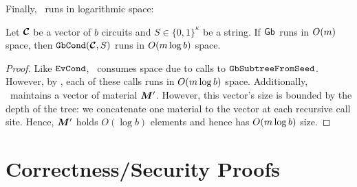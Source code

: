 Finally, \gbcond\ runs in logarithmic space:
\begin{lemma}\label{lemma:gbcondspace}
  Let $\vec{\cir}$ be a vector of $b$ circuits and $S \in \{0, 1\}^\kappa$ be a string.
  If $\textsf{Gb}$ runs in $O(m)$ space, then
  $\gbcond(\vec{\cir}, S)$ runs in $O(m \log b)$ space.
\end{lemma}
\begin{proof}
  Like $\mathtt{EvCond}$, \gbcond\ consumes space due to calls to
  $\mathtt{GbSubtreeFromSeed}$. However, by , each of these calls
  runs in $O(m \log b)$ space.
  Additionally, \computegarbage\ maintains a vector of material
  $\vec{\mat}'$.
  However, this vector's size is bounded by the depth of the tree: we
  concatenate one material to the vector at each recursive call
  site.
  Hence, $\vec{\mat}'$ holds $O(\log b)$ elements and hence has
  $O(m \log b)$ size.
\end{proof}

\section{Correctness/Security Proofs}\label{supp:proofs}

